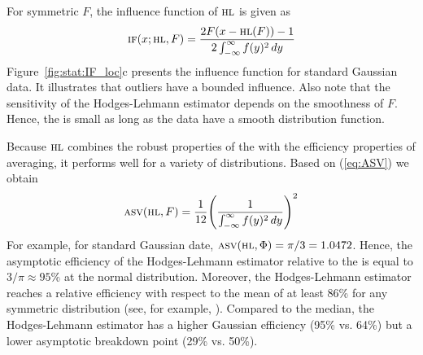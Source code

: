 For symmetric $F$, the influence function of $\stsc{HL}$ is given as
\[
    \stsc{IF}(x; \stsc{HL}, F) = \frac{2 F(x-\stsc{HL}(F)) - 1}{2 \int_{-\infty}^\infty f(y)^2 \dif y}
\]
Figure~\ref{fig:stat:IF_loc}c presents the influence function for standard Gaussian
data. It illustrates that outliers have a bounded influence. Also note that the 
sensitivity of the Hodges-Lehmann estimator depends on the smoothness of $F$.
Hence, the  is small as long as the data have a  
smooth distribution function.

Because $\stsc{HL}$ combines the robust properties of the  with the
efficiency properties of averaging, it performs well for a variety of
distributions. Based on (\ref{eq:ASV}) we obtain
\[
    \stsc{ASV}(\stsc{HL}, F) = \frac{1}{12} \left(\frac{1}{\int_{-\infty}^\infty f(y)^2 \dif y}\right)^2
\]
For example, for standard Gaussian date, $\stsc{ASV}(\stsc{HL}, \Phi) =
\pi/3 = 1.0472$. Hence, the asymptotic efficiency of the Hodges-Lehmann
estimator relative to the  is equal to $3/\pi \approx 95\%$ at the
normal distribution. Moreover, the Hodges-Lehmann estimator reaches a relative
efficiency with respect to the mean of at least 86\% for any symmetric
distribution (see, for example, \citealp[p. 120-121]{staudte:sheather:1990}).
Compared to the median, the Hodges-Lehmann estimator has a higher Gaussian
efficiency (95\% vs. 64\%) but a lower asymptotic breakdown point (29\% vs.
50\%).

